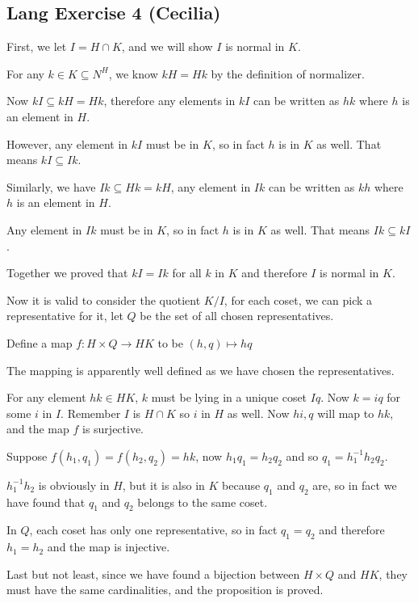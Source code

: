 \subsection*{Lang Exercise 4 (Cecilia)}

First, we let $ I = H \cap K $, and we will show $ I $ is normal in $ K $.

For any $ k \in K \subseteq N^{H}$, we know $ kH = Hk $ by the definition of normalizer.

Now $ kI \subseteq kH = Hk $, therefore any elements in $ kI $ can be written as $hk$ where $h$ is an element in $H$.

However, any element in $ kI $ must be in $K$, so in fact $h$ is in $K$ as well. That means $ kI \subseteq Ik $.

Similarly, we have $ Ik \subseteq Hk = kH$, any element in $ Ik $ can be written as $kh$ where $ h $ is an element in $H$.

Any element in $ Ik $ must be in $K$, so in fact $h$ is in $K$ as well. That means $ Ik \subseteq kI $.

Together we proved that $ kI = Ik $ for all $ k $ in $ K $ and therefore $ I $ is normal in $ K $.

Now it is valid to consider the quotient $ K/I $, for each coset, we can pick a representative for it, let $ Q $ be the set of all chosen representatives.

Define a map $ f: H \times Q \to HK $ to be $ (h, q) \mapsto hq $

The mapping is apparently well defined as we have chosen the representatives.

For any element $ hk \in HK $, $ k $ must be lying in a unique coset $ Iq $. Now $ k = iq $ for some $ i $ in $I$. Remember $ I $ is $ H \cap K $ so $ i $ in $ H $ as well. Now $ hi, q $ will map to $ hk $, and the map $ f $ is surjective.

Suppose $ f(h_1, q_1) = f(h_2, q_2) = hk $, now $ h_1 q_1 = h_2 q_2 $ and so $ q_1 = h_1^{-1} h_2 q_2 $.

$ h_1^{-1} h_2 $ is obviously in $ H $, but it is also in $ K $ because $ q_1 $ and $ q_2 $ are, so in fact we have found that $ q_1 $ and $ q_2 $ belongs to the same coset.

In $ Q $, each coset has only one representative, so in fact $ q_1 = q_2 $ and therefore $ h_1 = h_2 $ and the map is injective.

Last but not least, since we have found a bijection between $ H \times Q $ and $ HK $, they must have the same cardinalities, and the proposition is proved.